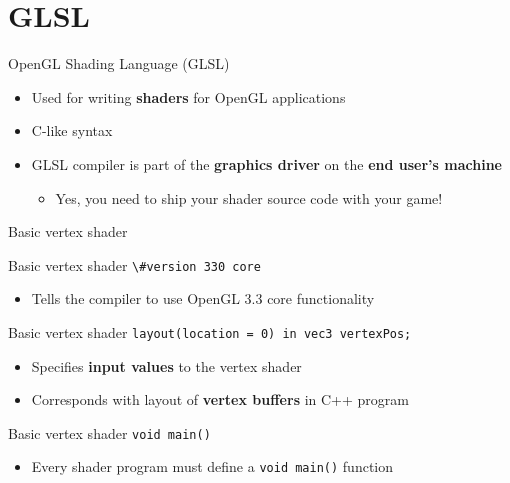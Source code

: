 \part{GLSL}
\frame{\partpage}

\begin{frame}{OpenGL Shading Language (GLSL)}
	\begin{itemize}
		\pause\item Used for writing \textbf{shaders} for OpenGL applications
		\pause\item C-like syntax
		\pause\item GLSL compiler is part of the \textbf{graphics driver}
			on the \textbf{end user's machine}
			\begin{itemize}
				\pause\item Yes, you need to ship your shader source code with your game!
			\end{itemize}
	\end{itemize}
\end{frame}

\begin{frame}{Basic vertex shader}
	
\end{frame}

\begin{frame}{Basic vertex shader}
	\lstinline{\#version 330 core}
	\begin{itemize}
		\pause\item Tells the compiler to use OpenGL 3.3 core functionality
	\end{itemize}
\end{frame}

\begin{frame}{Basic vertex shader}
	\lstinline{layout(location = 0) in vec3 vertexPos;}
	\begin{itemize}
		\pause\item Specifies \textbf{input values} to the vertex shader
		\pause\item Corresponds with layout of \textbf{vertex buffers} in C++ program
	\end{itemize}
\end{frame}

\begin{frame}{Basic vertex shader}
	\lstinline{void main()}
	\begin{itemize}
		\pause\item Every shader program must define a \lstinline{void main()} function
	\end{itemize}
\end{frame}

